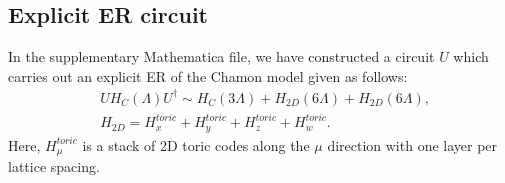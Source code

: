\documentclass[prx,twocolumn,superscriptaddress,nofootinbib,showpacs,notitlepage]{revtex4-2}
\newcommand{\Chamon}{Chamon }
\newcommand{\arpit}[1]{{\color{ultramarine}\footnotesize{(AD) #1}}}
\begin{document}
\subsection{Explicit ER circuit}
In the supplementary Mathematica file, we have constructed a circuit $U$ which carries out an explicit ER of the \Chamon model given as follows: 
\begin{align}
        &UH_C(\Lambda)U^\dagger\sim H_C(3\Lambda)+H_{2D}(6\Lambda)+H_{2D}(6\Lambda)\nonumber,\\
        &H_{2D}=H^{toric}_x+H^{toric}_y+H^{toric}_z+H_w^{toric}. 
\end{align}
Here, $H^{toric}_\mu$ is a stack of 2D toric codes along the $\mu$ direction with one layer per lattice spacing. %
\end{document}
